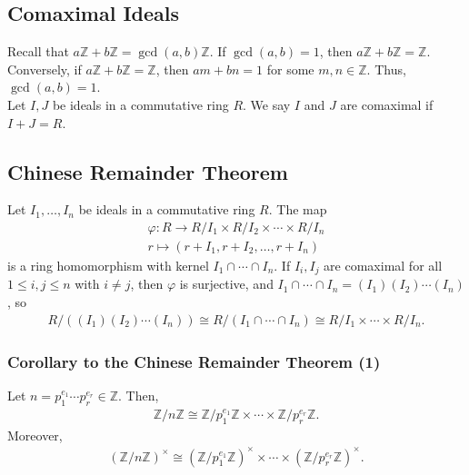 \documentclass[10pt]{extarticle}
\newcommand{\Z}{\mathbb{Z}}
\begin{document}
   \subsection{Comaximal Ideals}%
   Recall that $a\Z + b\Z = \gcd(a,b)\Z$. If $\gcd(a,b) = 1$, then $a\Z + b\Z = \Z$. Conversely, if $a\Z + b\Z = \Z$, then $am + bn = 1$ for some $m,n\in\Z$. Thus, $\gcd(a,b) = 1$.\\

   Let $I,J$ be ideals in a commutative ring $R$. We say $I$ and $J$ are comaximal if $I+J = R$.
   \subsection{Chinese Remainder Theorem}%
   Let $I_1,\dots,I_n$ be ideals in a commutative ring $R$. The map
   \begin{align*}
     \varphi: R\rightarrow R/I_1 \times R/I_2\times \cdots \times R/I_n\\
     r \mapsto (r + I_1,r+I_2,\dots,r+I_n)
   \end{align*}
   is a ring homomorphism with kernel $I_1\cap \cdots \cap I_n$. If $I_i,I_j$ are comaximal for all $1\leq i,j\leq n$ with $i\neq j$, then $\varphi$ is surjective, and $I_1\cap \cdots \cap I_n = (I_1)(I_2)\cdots(I_n)$, so
   \begin{align*}
     R/\left((I_1)(I_2)\cdots(I_n)\right) \cong R/(I_1\cap \cdots \cap I_n) \cong R/I_1\times\cdots\times R/I_n.
   \end{align*}
   \subsubsection{Corollary to the Chinese Remainder Theorem (1)}%
   Let $n = p_1^{e_1}\cdots p_r^{e_r}\in \Z$. Then,
   \begin{align*}
     \Z/n\Z \cong \Z/p_1^{e_1}\Z \times \cdots \times \Z/p_{r}^{e_r}\Z.
   \end{align*}
   Moreover,
   \begin{align*}
     \left(\Z/n\Z\right)^{\times} \cong \left(\Z/p_1^{e_1}\Z\right)^{\times} \times \cdots \times \left(\Z/p_{r}^{e_r}\Z\right)^{\times}.
   \end{align*}
\end{document}
